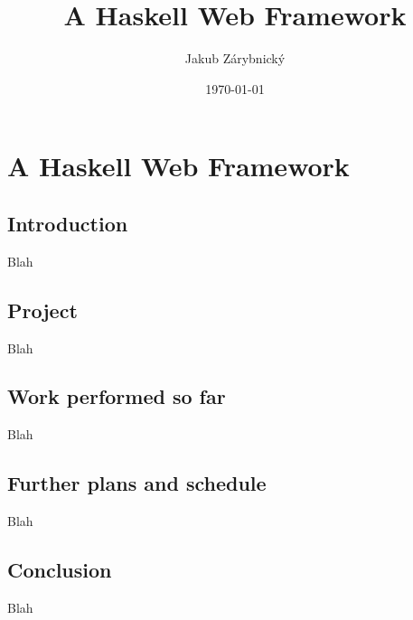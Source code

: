 \documentclass[11pt,a4paper]{scrartcl}
\author{Jakub Zárybnický}
\date{\today}
\title{A Haskell Web Framework}
\begin{document}
\maketitle
\tableofcontents


\section{A Haskell Web Framework}
\label{sec:org3d7f7e6}

\subsection{Introduction}
\label{sec:org8999d93}
Blah

\subsection{Project}
\label{sec:org2efc920}
Blah

\subsection{Work performed so far}
\label{sec:org09f2271}
Blah

\subsection{Further plans and schedule}
\label{sec:org1a1fbcd}
Blah

\subsection{Conclusion}
\label{sec:orgdd2a30f}
Blah
\end{document}

